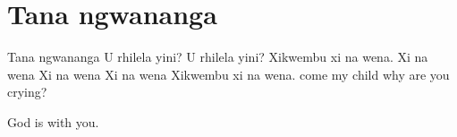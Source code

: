\starttocol
\chapter{Tana ngwananga}
\nexttocol
\hfill{\it }
\stoptocol
\starttocol
\startlines
{\sc Tana} ngwananga
U rhilela yini?
U rhilela yini?
Xikwembu xi na wena.
Xi na wena
Xi na wena
Xi na wena
Xikwembu xi na wena.
\stoplines
\nexttocol
\startlines
come my child
why are you crying?

God is with you.
\stoplines
\stoptocol
